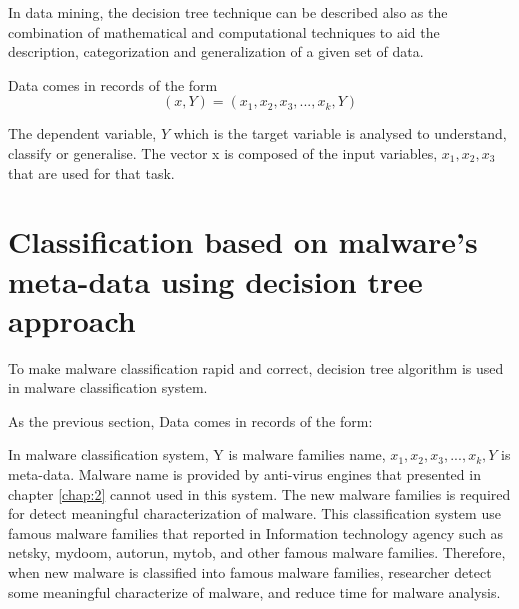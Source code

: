 In data mining, the decision tree technique can be described also as the combination of mathematical and computational techniques to aid the description, categorization and generalization of a given set of data.

Data comes in records of the form
\begin{equation}
    (x,Y) = (x_1, x_2, x_3, ..., x_k, Y) 
\end{equation}

The dependent variable, $Y$ which is the target variable is analysed to understand, classify or generalise. The vector x is composed of the input variables, $x_{1}, x_{2}, x_{3}$ that are used for that task.
\section{Classification based on malware's meta-data using decision tree approach}

To make malware classification rapid and correct, decision tree algorithm is used in malware classification system.

As the previous section, Data comes in records of the form:

In malware classification system, Y is malware families name, \(x_1, x_2, x_3, ..., x_k, Y\) is meta-data. Malware name is provided by anti-virus engines that presented in chapter \ref{chap:2} cannot used in this system. The new malware families is required for detect meaningful characterization of malware. This classification system use famous malware families that reported in Information technology agency such as netsky, mydoom, autorun, mytob, and other famous malware families. Therefore, when new malware is classified into famous malware families, researcher detect some meaningful characterize of malware, and reduce time for malware analysis. 

